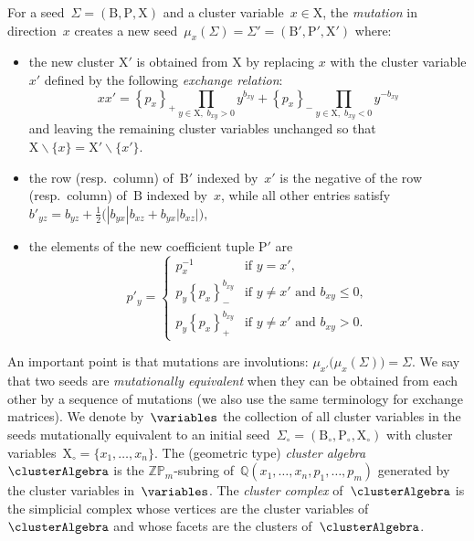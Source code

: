 \documentclass{amsart}
\theoremstyle{definition}
\newcommand{\Q}{\mathbb{Q}} %
\newcommand{\Z}{\mathbb{Z}} %
\newcommand{\ssm}{\smallsetminus} %
\newcommand{\darkblue}{\color{darkblue}} %
\newcommand{\defn}[1]{\textsl{\darkblue #1}} %
\newcommand{\Trop}[1]{\mathbb{P}_{#1}} %
\newcommand{\positiveExponents}[1]{\left\{#1\right\}_+} %
\newcommand{\negativeExponents}[1]{\left\{#1\right\}_-} %
\newcommand{\seed}{\Sigma} %
\newcommand{\cluster}{\mathrm{X}} %
\newcommand{\coefficients}{\mathrm{P}} %
\newcommand{\B}{\mathrm{B}} %
\begin{document}
For a seed~$\seed = (\B, \coefficients, \cluster)$ and a cluster variable~$x \in \cluster$, the \defn{mutation} in direction~$x$ creates a new seed~$\mu_x(\seed) = \seed' = (\B', \coefficients', \cluster')$ where:
\begin{itemize}
\item the new cluster $\cluster'$ is obtained from $\cluster$ by replacing $x$ with the cluster variable $x'$ defined by the following \defn{exchange relation}:
\[
x x' = \positiveExponents{p_x} \prod_{{y \in \cluster, \; b_{xy}  > 0}} y^{b_{xy}} + \negativeExponents{p_x} \prod_{{y \in \cluster, \; b_{xy}  <0}} y^{-b_{xy}}
\]
and leaving the remaining cluster variables unchanged so that $\cluster \ssm \{x\} = \cluster' \ssm \{x'\}$.

\item the row (resp.~column) of~$\B'$ indexed by~$x'$ is the negative of the row (resp.~column) of~$\B$ indexed by~$x$, while all other entries satisfy
\(
b'_{yz} = b_{yz} + \frac{1}{2}\big(|b_{yx}| b_{xz} + b_{yx}|b_{xz}|\big),
\)

\item the elements of the new coefficient tuple $\coefficients'$ are 
\[
p'_y =
\begin{cases}
	p_x^{-1}  & \text{if } y = x', \\
	p_y\negativeExponents{p_x}^{b_{xy}}  & \text{if } y \neq x' \text{ and } b_{xy} \leq 0, \\
	p_y\positiveExponents{p_x}^{b_{xy}}  & \text{if } y \neq x' \text{ and } b_{xy} > 0.
\end{cases}
\]
\end{itemize}
An important point is that mutations are involutions: $\mu_{x'} \big( \mu_{x}(\seed) \big) = \seed$.
We say that two seeds are \defn{mutationally equivalent} when they can be obtained from each other by a sequence of mutations (we also use the same terminology for exchange matrices).
We denote by~$\variables$ the collection of all cluster variables in the seeds mutationally equivalent to an initial seed~$\seed_\circ = (\B_\circ, \coefficients_\circ, \cluster_\circ)$ with cluster variables~$\cluster_\circ = \{x_1, \dots, x_n\}$.
The (geometric type) \defn{cluster algebra} $\clusterAlgebra$ is the $\Z\Trop{m}$-subring of~$\Q(x_1, \dots, x_n, p_1, \dots, p_m)$ generated by the cluster variables in~$\variables$.
The \defn{cluster complex} of~$\clusterAlgebra$ is the simplicial complex whose vertices are the cluster variables of~$\clusterAlgebra$ and whose facets are the clusters of~$\clusterAlgebra$.
\end{document}
